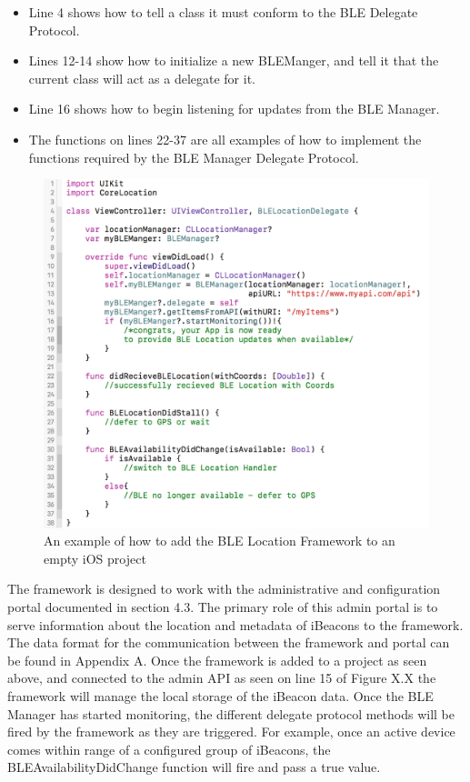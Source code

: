 \begin{itemize}
\item Line 4 shows how to tell a class it must conform to the BLE Delegate Protocol.
\item Lines 12-14 show how to initialize a new BLEManger, and tell it that the current class will act as a delegate for it.
\item Line 16 shows how to begin listening for updates from the BLE Manager.
\item The functions on lines 22-37 are all examples of how to implement the functions required by the BLE Manager Delegate Protocol.
\end{itemize}

\begin{figure}[h]
\includegraphics[width=1\textwidth]{images/code.png}
\caption{An example of how to add the BLE Location Framework to an empty iOS project}
\end{figure}

The framework is designed to work with the administrative and configuration portal documented in section 4.3.  The primary role of this admin portal is to serve information about the location and metadata of iBeacons to the framework.  The data format for the communication between the framework and portal can be found in Appendix A.  Once the framework is added to a project as seen above, and connected to the admin API as seen on line 15 of Figure X.X the framework will manage the local storage of the iBeacon data.  Once the BLE Manager has started monitoring, the different delegate protocol methods will be fired by the framework as they are triggered.  For example, once an active device comes within range of a configured group of iBeacons, the BLEAvailabilityDidChange function will fire and pass a true value.
